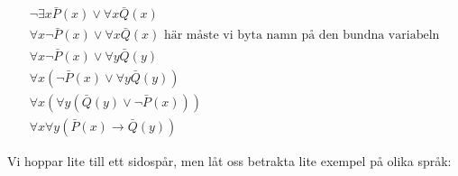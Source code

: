 \begin{equation*}
  \begin{gathered}
    \neg\exists x\bar{P}(x)\vee\forall x \bar{Q}(x)\\
    \forall x\neg\bar{P}(x)\vee\forall x\bar{Q}(x)\text{ här måste vi byta namn på den bundna variabeln}\\
    \forall x \neg\bar{P}(x)\vee\forall y\bar{Q}(y)\\
    \forall x\left(\neg\bar{P}(x)\vee\forall y\bar{Q}(y)\right)\\
    \forall x\left(\forall y\left(\bar{Q}(y)\vee\neg\bar{P}(x)\right)\right)\\
    \forall x\forall y\left(\bar{P}(x)\rightarrow\bar{Q}(y)\right)
  \end{gathered}
\end{equation*}
\par\bigskip
\noindent Vi hoppar lite till ett sidospår, men låt oss betrakta lite exempel på olika språk:
